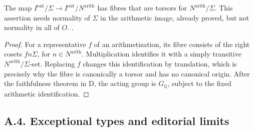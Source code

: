 The map $I^{\mathrm{out}}/\Sigma\to I^{\mathrm{out}}/N^{\mathrm{arith}}$ has fibres that are torsors for $N^{\mathrm{arith}}/\Sigma$. This assertion needs normality of $\Sigma$ in the arithmetic image, already proved, but not normality in all of $O$.
.
\begin{proof}
For a representative $f$ of an arithmetization, its fibre consists of the right cosets $fn\Sigma$, for $n\in N^{\mathrm{arith}}$. Multiplication identifies it with a simply transitive $N^{\mathrm{arith}}/\Sigma$-set. Replacing $f$ changes this identification by translation, which is precisely why the fibre is canonically a torsor and has no canonical origin. After the faithfulness theorem in D, the acting group is $G_{\mathbb Q}$, subject to the fixed arithmetic identification.
\end{proof}

\subsection{A.4. Exceptional types and editorial limits}


